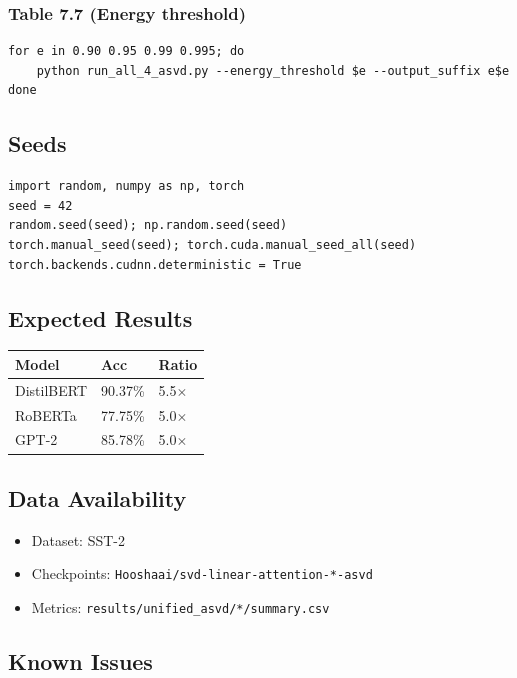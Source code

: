 \subsubsection{Table 7.7 (Energy threshold)}
\begin{lstlisting}
for e in 0.90 0.95 0.99 0.995; do
    python run_all_4_asvd.py --energy_threshold $e --output_suffix e$e
done
\end{lstlisting}

\subsection{Seeds}

\begin{lstlisting}
import random, numpy as np, torch
seed = 42
random.seed(seed); np.random.seed(seed)
torch.manual_seed(seed); torch.cuda.manual_seed_all(seed)
torch.backends.cudnn.deterministic = True
\end{lstlisting}

\subsection{Expected Results}

\begin{table}[H]
\centering
\small
\begin{tabular}{lll}
\toprule
\textbf{Model} & \textbf{Acc} & \textbf{Ratio} \\
\midrule
DistilBERT & 90.37\% & 5.5$\times$ \\
RoBERTa & 77.75\% & 5.0$\times$ \\
GPT-2 & 85.78\% & 5.0$\times$ \\
\bottomrule
\end{tabular}
\end{table}

\subsection{Data Availability}

\begin{itemize}
\item Dataset: SST-2
\item Checkpoints: \texttt{Hooshaai/svd-linear-attention-*-asvd}
\item Metrics: \texttt{results/unified\_asvd/*/summary.csv}

\end{itemize}
\subsection{Known Issues}

